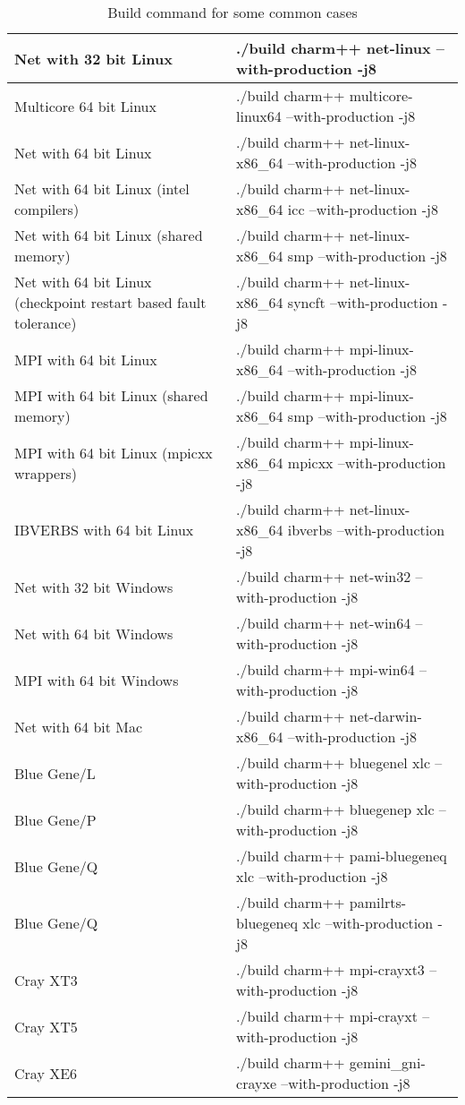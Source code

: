 \begin{table}[ht]
\begin{tabular}{|p{6cm}|p{9cm}|}
\hline
Net with 32 bit Linux & ./build charm++ net-linux --with-production -j8
\\\hline
Multicore 64 bit Linux & ./build charm++ multicore-linux64 --with-production -j8
\\\hline
Net with 64 bit Linux & ./build charm++ net-linux-x86\_64 --with-production -j8
\\\hline
Net with 64 bit Linux (intel compilers) & ./build charm++ net-linux-x86\_64 icc --with-production -j8
\\\hline
Net with 64 bit Linux (shared memory) & ./build charm++ net-linux-x86\_64 smp --with-production -j8
\\\hline
Net with 64 bit Linux (checkpoint restart based fault tolerance) & ./build charm++ net-linux-x86\_64 syncft --with-production -j8
\\\hline
MPI with 64 bit Linux & ./build charm++ mpi-linux-x86\_64 --with-production -j8
\\\hline
MPI with 64 bit Linux (shared memory) & ./build charm++ mpi-linux-x86\_64 smp --with-production -j8
\\\hline
MPI with 64 bit Linux (mpicxx wrappers) & ./build charm++ mpi-linux-x86\_64 mpicxx --with-production -j8
\\\hline
IBVERBS with 64 bit Linux & ./build charm++ net-linux-x86\_64 ibverbs --with-production -j8
\\\hline
Net with 32 bit Windows & ./build charm++ net-win32 --with-production -j8
\\\hline
Net with 64 bit Windows & ./build charm++ net-win64 --with-production -j8
\\\hline
MPI with 64 bit Windows & ./build charm++ mpi-win64 --with-production -j8
\\\hline
Net with 64 bit Mac & ./build charm++ net-darwin-x86\_64 --with-production -j8
\\\hline
Blue Gene/L & ./build charm++ bluegenel xlc --with-production -j8
\\\hline
Blue Gene/P & ./build charm++ bluegenep xlc --with-production -j8
\\\hline
Blue Gene/Q & ./build charm++ pami-bluegeneq xlc --with-production -j8
\\\hline
Blue Gene/Q & ./build charm++ pamilrts-bluegeneq xlc --with-production -j8
\\\hline
Cray XT3 & ./build charm++ mpi-crayxt3 --with-production -j8
\\\hline
Cray XT5 & ./build charm++ mpi-crayxt --with-production -j8
\\\hline
Cray XE6 & ./build charm++ gemini\_gni-crayxe --with-production -j8
\\\hline
\end{tabular}
\caption{Build command for some common cases}
\label{tab:buildlist}
\end{table}


